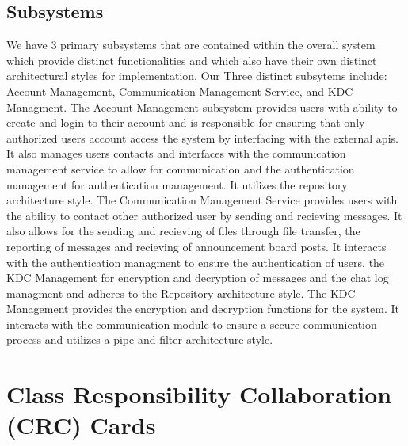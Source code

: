 \documentclass[]{article}
\begin{document}
\subsection{Subsystems}
\label{sub:subsystems}
We have 3 primary subsystems that are contained within the overall system which provide distinct functionalities and which also have their own distinct architectural styles for implementation. Our Three distinct subsytems include: Account Management, Communication Management Service, and KDC Managment.
\newline
\newline
The Account Management subsystem provides users with ability to create and login to their account and is responsible for ensuring that only authorized users account access the system by interfacing with the external apis. It also manages users contacts and interfaces with the communication management service to allow for communication and the authentication management for authentication management. It utilizes the repository architecture style.
\newline
\newline
The Communication Management Service provides users with the ability to contact other authorized user by sending and recieving messages. It also allows for the sending and recieving of files through file transfer, the reporting of messages and recieving of announcement board posts. It interacts with the authentication managment to ensure the authentication of users, the KDC Management for encryption and decryption of messages and the chat log managment and adheres to the Repository architecture style.
\newline
\newline
The KDC Management provides the encryption and decryption functions for the system. It interacts with the communication module to ensure a secure communication process and utilizes a pipe and filter architecture style.


\section{Class Responsibility Collaboration (CRC) Cards}
\label{sec:class_responsibility_collaboration_crc_cards}
\end{document}
